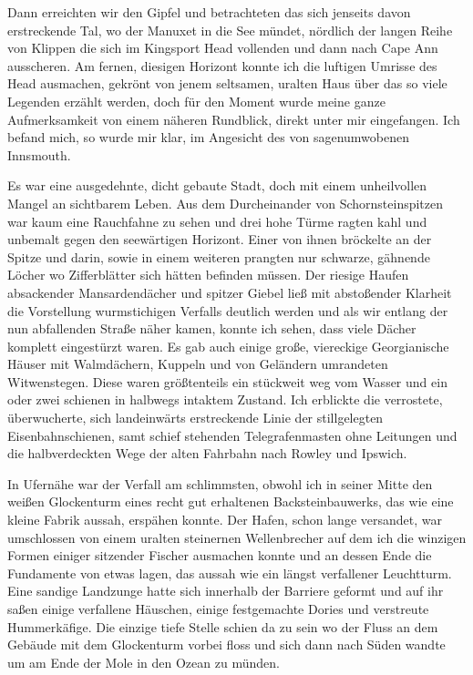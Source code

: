 Dann erreichten wir den Gipfel und betrachteten das sich jenseits davon erstreckende Tal, wo der Manuxet in die See mündet, nördlich der langen Reihe von Klippen die sich im Kingsport Head vollenden und dann nach Cape Ann ausscheren. Am fernen, diesigen Horizont konnte ich die luftigen Umrisse des Head ausmachen, gekrönt von jenem seltsamen, uralten Haus über das so viele Legenden erzählt werden, doch für den Moment wurde meine ganze Aufmerksamkeit von einem näheren Rundblick, direkt unter mir eingefangen. Ich befand mich, so wurde mir klar, im Angesicht des von sagenumwobenen Innsmouth.

Es war eine ausgedehnte, dicht gebaute Stadt, doch mit einem unheilvollen Mangel an sichtbarem Leben. Aus dem Durcheinander von Schornsteinspitzen war kaum eine Rauchfahne zu sehen und drei hohe Türme ragten kahl und unbemalt gegen den seewärtigen Horizont. Einer von ihnen bröckelte an der Spitze und darin, sowie in einem weiteren prangten nur schwarze, gähnende Löcher wo Zifferblätter sich hätten befinden müssen. Der riesige Haufen absackender Mansardendächer und spitzer Giebel ließ mit abstoßender Klarheit die Vorstellung wurmstichigen Verfalls deutlich werden und als wir entlang der nun abfallenden Straße näher kamen, konnte ich sehen, dass viele Dächer komplett eingestürzt waren. Es gab auch einige große, viereckige Georgianische Häuser mit Walmdächern, Kuppeln und von Geländern umrandeten Witwenstegen. Diese waren größtenteils ein stückweit weg vom Wasser und ein oder zwei schienen in halbwegs intaktem Zustand. Ich erblickte die verrostete, überwucherte, sich landeinwärts erstreckende Linie der stillgelegten Eisenbahnschienen, samt schief stehenden Telegrafenmasten ohne Leitungen und die halbverdeckten Wege der alten Fahrbahn nach Rowley und Ipswich.

In Ufernähe war der Verfall am schlimmsten, obwohl ich in seiner Mitte den weißen Glockenturm eines recht gut erhaltenen Backsteinbauwerks, das wie eine kleine Fabrik aussah, erspähen konnte. Der Hafen, schon lange versandet, war umschlossen von einem uralten steinernen Wellenbrecher auf dem ich die winzigen Formen einiger sitzender Fischer ausmachen konnte und an dessen Ende die Fundamente von etwas lagen, das aussah wie ein längst verfallener Leuchtturm. Eine sandige Landzunge hatte sich innerhalb der Barriere geformt und auf ihr saßen einige verfallene Häuschen, einige festgemachte Dories und verstreute Hummerkäfige. Die einzige tiefe Stelle schien da zu sein wo der Fluss an dem Gebäude mit dem Glockenturm vorbei floss und sich dann nach Süden wandte um am Ende der Mole in den Ozean zu münden.

